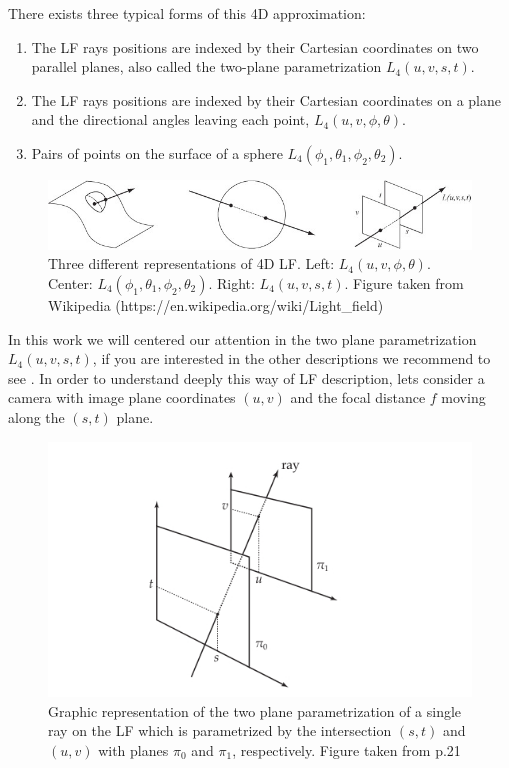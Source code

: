 \bigskip 

 There exists three typical forms of this 4D approximation: 
\begin{enumerate}
\item The LF rays positions are indexed by their Cartesian coordinates on two parallel planes, also called the two-plane parametrization $L_4(u,v,s,t)$.
\item The LF rays positions are indexed by their Cartesian coordinates on a plane and the directional angles leaving each point, $L_4(u,v,\phi,\theta)$.
\item Pairs of points on the surface of a sphere $L_4(\phi_1,\theta_1,\phi_2,\theta_2)$.
\end{enumerate}

\bigskip

\begin{figure}[h!]
\centering
\includegraphics[width=1.0\textwidth]{./Diagrams/Light-field-parametrizations.jpg}
\caption{Three different representations of 4D LF\@. Left: $L_4(u,v,\phi,\theta)$. Center: $L_4(\phi_1,\theta_1,\phi_2,\theta_2)$. Right: $L_4(u,v,s,t)$. Figure taken from Wikipedia (https://en.wikipedia.org/wiki/Light\_field)}
\end{figure}

\bigskip

In this work we will centered our attention in the two plane parametrization $L_4(u,v,s,t)$, if you are interested in the other descriptions we recommend to see \cite{Liang}. In order to understand deeply this way of LF description, lets consider a camera with image plane coordinates $(u,v)$ and the focal distance $f$ moving along the $(s,t)$ plane. 

\bigskip

\begin{figure}[h!]
\centering
\includegraphics[width=1.0\textwidth]{./Diagrams/two-planes_param.jpg}
\caption{Graphic representation of the two plane parametrization of a single ray on the LF which is parametrized by the intersection $(s,t)$ and $(u,v)$ with planes $\pi_0$ and $\pi_1$, respectively. Figure taken from \cite{Kim-Disney} p.21}
\label{fig:C2S0F3}
\end{figure}

